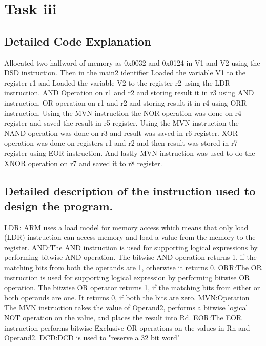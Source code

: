 \documentclass{article}
\begin{document}
\section{Task iii} 

\subsection{Detailed Code Explanation}

Allocated two halfword of memory as 0x0032 and 0x0124 in V1 and V2 using the DSD instruction. Then in the main2 identifier Loaded the variable V1 to the register r1 and Loaded the variable V2 to the register r2 using the LDR instruction. AND Operation on r1 and r2 and storing result it in r3 using AND instruction. OR operation on r1 and r2 and storing result it in r4 using ORR instruction. Using the MVN instruction the NOR operation was done on r4 register and saved the result in r5 register. Using the MVN instruction the NAND operation was done on r3 and result was saved in r6 register. XOR operation was done on registers r1 and r2 and then result was stored in r7 register using EOR instruction. And lastly MVN instruction was used to do the XNOR operation on r7 and saved it to r8 register. 

\subsection{Detailed description of the instruction used to design the program.}

LDR: ARM uses a load model for memory access which means that only load (LDR) instruction can access memory and load a value from the memory to the register.\newline\newline
AND:The AND instruction is used for supporting logical expressions by performing bitwise AND operation. The bitwise AND operation returns 1, if the matching bits from both the operands are 1, otherwise it returns 0.\newline\newline
ORR:The OR instruction is used for supporting logical expression by performing bitwise OR operation. The bitwise OR operator returns 1, if the matching bits from either or both operands are one. It returns 0, if both the bits are zero.\newline\newline
MVN:Operation The MVN instruction takes the value of Operand2, performs a bitwise logical NOT operation on the value, and places the result into Rd.\newline\newline
EOR:The EOR instruction performs bitwise Exclusive OR operations on the values in Rn and Operand2.\newline\newline
DCD:DCD is used to "reserve a 32 bit word"\newline\newline
\end{document}
